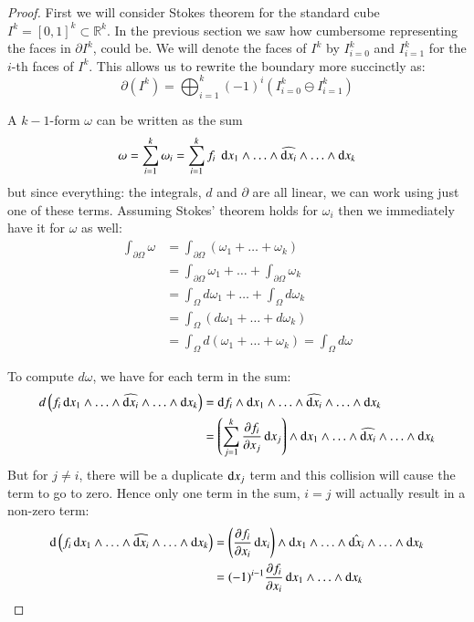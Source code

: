 \begin{proof}

First we will consider Stokes theorem for the standard cube $I^k = [0,1]^k \subset \mathbb{R}^k$.
In the previous section we saw how cumbersome representing the faces in $\partial I^k$, could be.
We will denote the faces of $I^k$ by $I^k_{i=0}$ and $I^k_{i=1}$ for the $i$-th faces of $I^k$.
This allows us to rewrite the boundary more succinctly as:
\begin{equation*}
	\partial (I^k) = \bigoplus_{i=1}^k (-1)^i \left( I^k_{i=0} \ominus I^k_{i=1} \right) 
\end{equation*}



A $k-1$-form $\omega$ can be written as the sum
\begin{equation*}
	\omega 
		= \sum_{i=1}^k \omega_i 
		= \sum_{i=1}^k f_i \; \mathop{}\!\mathrm{d} x_1 \wedge \ldots \wedge \widehat{\mathop{}\!\mathrm{d} x_i} \wedge  \ldots \wedge \mathop{}\!\mathrm{d} x_k
\end{equation*}
but since everything: the integrals, $d$ and $\partial$ are all linear, we can work using just one of these terms.
Assuming Stokes' theorem holds for $\omega_i$ then we immediately have it for $\omega$ as well:
\begin{align*}
	\int_{\partial\Omega} \omega 
	&= \int_{\partial \Omega} (\omega_1 + \ldots + \omega_k) \\
	&= \int_{\partial\Omega} \omega_1 + \ldots + \int_{\partial\Omega} \omega_k  \\
	&= \int_{\Omega} d\omega_1 + \ldots + \int_\Omega d\omega_k \\
	&= \int_\Omega (d\omega_1 + \ldots + d\omega_k)\\
	&= \int_\Omega d(\omega_1 + \ldots + \omega_k) = \int_\Omega d\omega
\end{align*}



To compute $d\omega$, we have for each term in the sum:
\begin{align*}
	d \left( f_i \diff x_1 \wedge \ldots \wedge \widehat{\diff x_i} \wedge  \ldots \wedge \diff x_k \right) 
 		&= \diff f_i \wedge \diff x_1 \wedge \ldots \wedge \widehat{\diff x_i} \wedge  \ldots \wedge \diff x_k \\ 
 		&= \left( \sum_{j=1}^k \frac{\partial f_i}{\partial x_j} \diff x_j \right)
 			\wedge \diff x_1 \wedge \ldots \wedge \widehat{\diff x_i} \wedge  \ldots \wedge \diff x_k
\end{align*}
But for $j \neq i$, there will be a duplicate $\mathop{}\!\mathrm{d} x_j$ term and this collision will cause the term to go to zero.
Hence only one term in the sum, $i=j$ will actually result in a non-zero term:
\begin{align*}
	\diff \left( f_i \diff x_1 \wedge \ldots \wedge \widehat{\diff x_i} \wedge  \ldots \wedge \diff x_k \right) 
 		&= \left(\frac{\partial f_i}{\partial x_i} \diff x_i \right)
 			\wedge \diff x_1 \wedge \ldots \wedge \hat{\diff x_i} \wedge  \ldots \wedge \diff x_k \\ 
		&= (-1)^{i-1} \frac{\partial f_i}{\partial x_i}
 			 \diff x_1 \wedge \ldots \wedge \diff x_k
\end{align*}




\end{proof}
